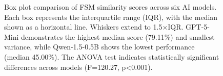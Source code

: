 \documentclass[12pt]{article}
\begin{document}
\begin{figure}[htbp]
\caption{Box plot comparison of FSM similarity scores across six AI models. Each box represents the interquartile range (IQR), with the median shown as a horizontal line. Whiskers extend to 1.5×IQR. GPT-5-Mini demonstrates the highest median score (79.11\%) and smallest variance, while Qwen-1.5-0.5B shows the lowest performance (median 45.00\%). The ANOVA test indicates statistically significant differences across models (F=120.27, p<0.001).}
\label{fig:fsm-boxplot}
\end{figure}
\end{document}
